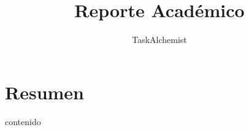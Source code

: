 \documentclass{article}
\title{Reporte Académico}
\author{TaskAlchemist}
\begin{document}
\maketitle
\section*{Resumen}
{{ contenido }}
\end{document}
